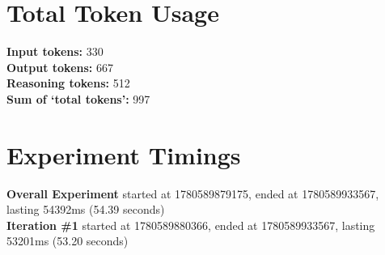 \documentclass{article}
\begin{document}
\section*{Total Token Usage}
\textbf{Input tokens: }330
\\\textbf{Output tokens: }667
\\\textbf{Reasoning tokens: }512
\\\textbf{Sum of `total tokens': }997
\section*{Experiment Timings}
\textbf{Overall Experiment} started at 1780589879175, ended at 1780589933567, lasting 54392ms (54.39 seconds)
\\\textbf{Iteration \#1} started at 1780589880366, ended at 1780589933567, lasting 53201ms (53.20 seconds)
\end{document}
